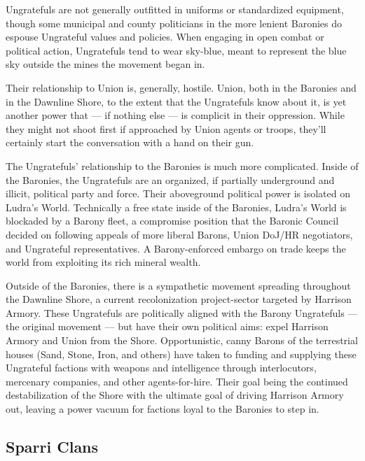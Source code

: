 Ungratefuls are not generally outfitted in uniforms or standardized equipment, though some  
municipal and county politicians in the more lenient Baronies do espouse Ungrateful values and  
policies. When engaging in open combat or political action, Ungratefuls tend to wear sky-blue,  
meant to represent the blue sky outside the mines the movement began in.
 

Their relationship to Union is, generally, hostile. Union, both in the Baronies and in the Dawnline  
Shore, to the extent that the Ungratefuls know about it, is yet another power that — if nothing  
else — is complicit in their oppression. While they might not shoot first if approached by Union  
agents or troops, they’ll certainly start the conversation with a hand on their gun.  
 

The Ungratefuls’ relationship to the Baronies is much more complicated. Inside of the Baronies,  
the Ungratefuls are an organized, if partially underground and illicit, political party and force.  
Their aboveground political power is isolated on Ludra’s World. Technically a free state inside of  
the Baronies, Ludra’s World is blockaded by a Barony fleet, a compromise position that the  
Baronic Council decided on following appeals of more liberal Barons, Union DoJ/HR negotiators,  
and Ungrateful representatives. A Barony-enforced embargo on trade keeps the world from  
exploiting its rich mineral wealth. 
 

Outside of the Baronies, there is a sympathetic movement spreading throughout the Dawnline  
Shore, a current recolonization project-sector targeted by Harrison Armory. These Ungratefuls  
are politically aligned with the Barony Ungratefuls — the original movement — but have their own  
political aims: expel Harrison Armory and Union from the Shore. Opportunistic, canny Barons of  
the terrestrial houses (Sand, Stone, Iron, and others) have taken to funding and supplying these  
Ungrateful factions with weapons and intelligence through interlocutors, mercenary companies,  
and other agents-for-hire. Their goal being the continued destabilization of the Shore with the  
ultimate goal of driving Harrison Armory out, leaving a power vacuum for factions loyal to the  
Baronies to step in. 
 

                                                                                                         
\subsection{Sparri Clans}

